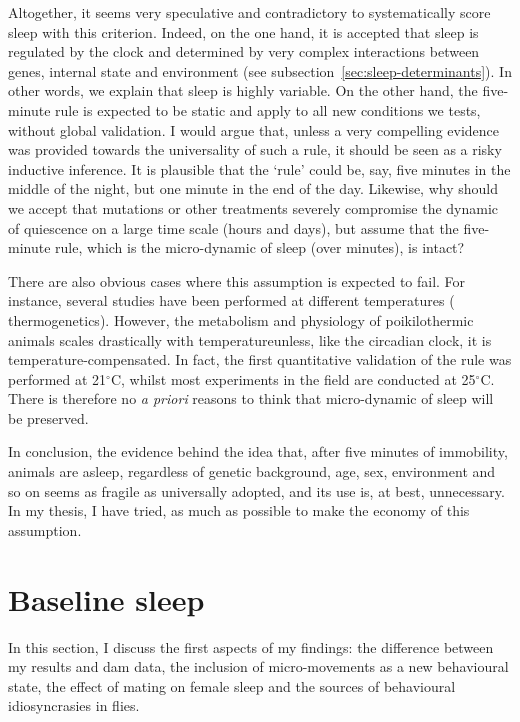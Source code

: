 Altogether, it seems very speculative and contradictory to systematically score sleep with this criterion.
Indeed, on the one hand, it is accepted that sleep is regulated by the clock and determined by very complex interactions between genes, internal state and environment (see subsection~\ref{sec:sleep-determinants}).
In other words, we explain that sleep is highly variable.
On the other hand, the five-minute rule is expected to be static and apply to all new conditions we tests, without global validation. 
I would argue that, unless a very compelling evidence was provided towards the universality of such a rule, it should be seen as a risky inductive inference.
It is plausible that the `rule' could be, say, five minutes in the middle of the night, but one minute in the end of the day.
Likewise, why should we accept that mutations or other treatments severely compromise the dynamic of quiescence on a large time scale (hours and days), but assume that the five-minute rule, which is the micro-dynamic of sleep (over minutes), is intact?

There are also obvious cases where this assumption is expected to fail.
For instance, several studies have been performed at different temperatures (\eg{} thermogenetics)\cite{kayser_sleep_2015,dubowy_genetic_2016,beckwith_regulation_2017}.
However, the metabolism and physiology of poikilothermic animals scales drastically with temperature\emd{}unless, like the circadian clock, it is temperature-compensated.
In fact, the first quantitative validation of the rule was performed at 21$^{\circ}$C\cite{huber_sleep_2004}, whilst most experiments in the field are conducted at 25$^{\circ}$C.
There is therefore no \emph{a priori} reasons to think that micro-dynamic of sleep will be preserved.

In conclusion, the evidence behind the idea that, after five minutes of immobility, animals are asleep, regardless of genetic background, age, sex, environment and so on seems as fragile as universally adopted, and its use is, at best, unnecessary.
In my thesis, I have tried, as much as possible to make the economy of this assumption.

\newpage
\section{Baseline sleep}
In this section, I discuss the first aspects of my findings: 
the difference between my results and \gls{dam} data, 
the inclusion of micro-movements as a new behavioural state,
the effect of mating on female sleep and
the sources of behavioural idiosyncrasies in flies.

